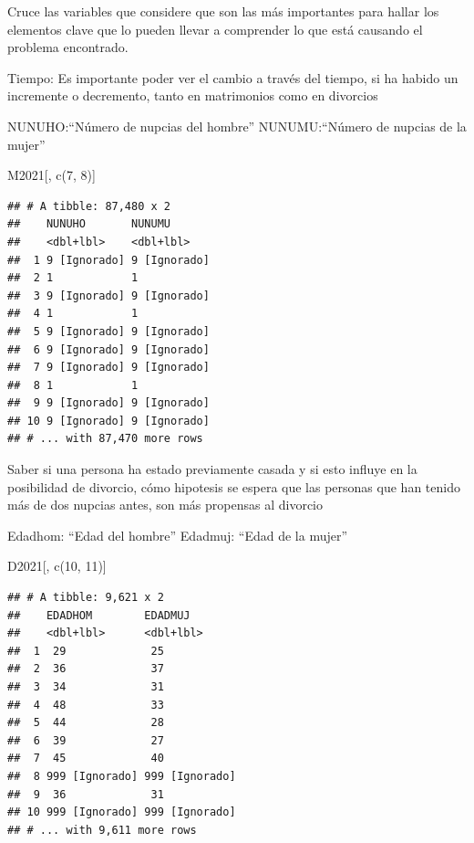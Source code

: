 \documentclass[
]{article}
\newenvironment{Shaded}{\begin{snugshade}}{\end{snugshade}}
\newcommand{\DecValTok}[1]{\textcolor[rgb]{0.00,0.00,0.81}{#1}}
\newcommand{\FunctionTok}[1]{\textcolor[rgb]{0.00,0.00,0.00}{#1}}
\newcommand{\NormalTok}[1]{#1}
\begin{document}
Cruce las variables que considere que son las más importantes para
hallar los elementos clave que lo pueden llevar a comprender lo que está
causando el problema encontrado.

Tiempo: Es importante poder ver el cambio a través del tiempo, si ha
habido un incremente o decremento, tanto en matrimonios como en
divorcios

NUNUHO:``Número de nupcias del hombre'' NUNUMU:``Número de nupcias de la
mujer''

\begin{Shaded}
\begin{Highlighting}[]
\NormalTok{M2021[, }\FunctionTok{c}\NormalTok{(}\DecValTok{7}\NormalTok{, }\DecValTok{8}\NormalTok{)]}
\end{Highlighting}
\end{Shaded}

\begin{verbatim}
## # A tibble: 87,480 x 2
##    NUNUHO       NUNUMU      
##    <dbl+lbl>    <dbl+lbl>   
##  1 9 [Ignorado] 9 [Ignorado]
##  2 1            1           
##  3 9 [Ignorado] 9 [Ignorado]
##  4 1            1           
##  5 9 [Ignorado] 9 [Ignorado]
##  6 9 [Ignorado] 9 [Ignorado]
##  7 9 [Ignorado] 9 [Ignorado]
##  8 1            1           
##  9 9 [Ignorado] 9 [Ignorado]
## 10 9 [Ignorado] 9 [Ignorado]
## # ... with 87,470 more rows
\end{verbatim}

Saber si una persona ha estado previamente casada y si esto influye en
la posibilidad de divorcio, cómo hipotesis se espera que las personas
que han tenido más de dos nupcias antes, son más propensas al divorcio

Edadhom: ``Edad del hombre'' Edadmuj: ``Edad de la mujer''

\begin{Shaded}
\begin{Highlighting}[]
\NormalTok{D2021[, }\FunctionTok{c}\NormalTok{(}\DecValTok{10}\NormalTok{, }\DecValTok{11}\NormalTok{)]}
\end{Highlighting}
\end{Shaded}

\begin{verbatim}
## # A tibble: 9,621 x 2
##    EDADHOM        EDADMUJ       
##    <dbl+lbl>      <dbl+lbl>     
##  1  29             25           
##  2  36             37           
##  3  34             31           
##  4  48             33           
##  5  44             28           
##  6  39             27           
##  7  45             40           
##  8 999 [Ignorado] 999 [Ignorado]
##  9  36             31           
## 10 999 [Ignorado] 999 [Ignorado]
## # ... with 9,611 more rows
\end{verbatim}
\end{document}
